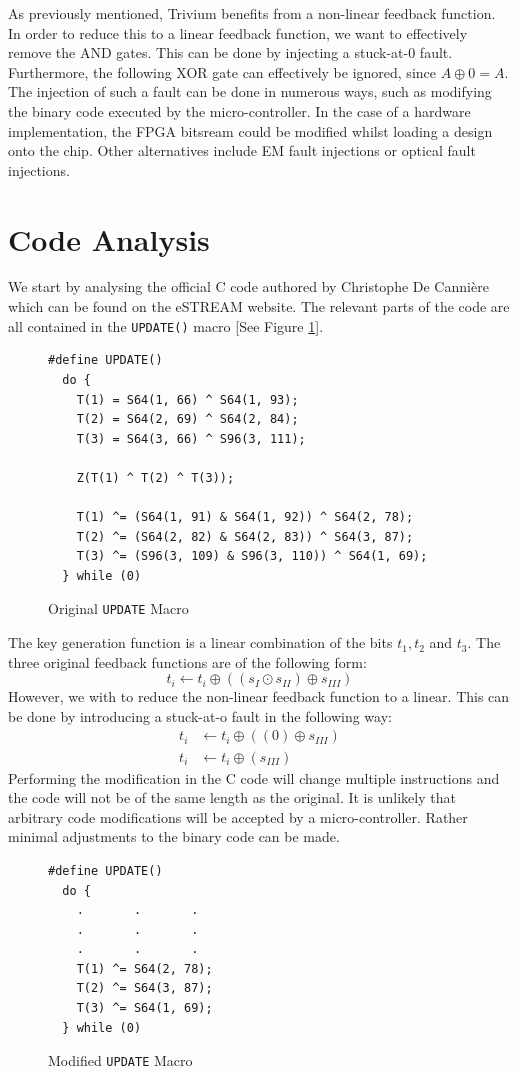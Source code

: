 \documentclass[conference]{IEEEtran}
\newcommand{\code}[1]{\texttt{#1}}
\begin{document}
As previously mentioned, Trivium benefits from a non-linear feedback function. In order to reduce this to a linear feedback function, we want to effectively remove the AND gates. This can be done by injecting a stuck-at-0 fault. Furthermore, the following XOR gate can effectively be ignored, since $A\oplus0=A$. The injection of such a fault can be done in numerous ways, such as modifying the binary code executed by the micro-controller. In the case of a hardware implementation, the FPGA bitsream could be modified whilst loading a design onto the chip. Other alternatives include EM fault injections or optical fault injections.

\section{Code Analysis}

We start by analysing the official C code authored by Christophe De Canni\`ere which can be found on the eSTREAM website. The relevant parts of the code are all contained in the \code{UPDATE()} macro [See Figure \ref{orig:macro}].

\begin{figure}[H]
\begin{lstlisting}[style=snippet, frame=tlrb]
#define UPDATE()
  do { 
    T(1) = S64(1, 66) ^ S64(1, 93);
    T(2) = S64(2, 69) ^ S64(2, 84);
    T(3) = S64(3, 66) ^ S96(3, 111);

    Z(T(1) ^ T(2) ^ T(3));

    T(1) ^= (S64(1, 91) & S64(1, 92)) ^ S64(2, 78);
    T(2) ^= (S64(2, 82) & S64(2, 83)) ^ S64(3, 87);
    T(3) ^= (S96(3, 109) & S96(3, 110)) ^ S64(1, 69);
  } while (0)
\end{lstlisting}
\caption{Original \code{UPDATE} Macro}\label{orig:macro}
\end{figure}

The key generation function is a linear combination of the bits $t_1, t_2$ and $t_3$.
The three original feedback functions are of the following form: $$t_i \gets t_i \oplus ((s_I \odot s_{II}) \oplus s_{III})$$ However, we with to reduce the non-linear feedback function to a linear. This can be done by introducing a stuck-at-o fault in the following way:
\begin{align*}
t_i &\gets t_i \oplus ((0) \oplus s_{III})\\
t_i &\gets t_i \oplus (s_{III})
\end{align*}
Performing the modification in the C code will change multiple instructions and the code will not be of the same length as the original. It is unlikely that arbitrary code modifications will be accepted by a micro-controller. Rather minimal adjustments to the binary code can be made.
\begin{figure}[H]
\begin{lstlisting}[style=snippet, frame=tlrb]
#define UPDATE()
  do {
    .       .       .
    .       .       .
    .       .       .
    T(1) ^= S64(2, 78); 
    T(2) ^= S64(3, 87); 
    T(3) ^= S64(1, 69); 
  } while (0)
\end{lstlisting}
\caption{Modified \code{UPDATE} Macro}
\end{figure}
\end{document}
